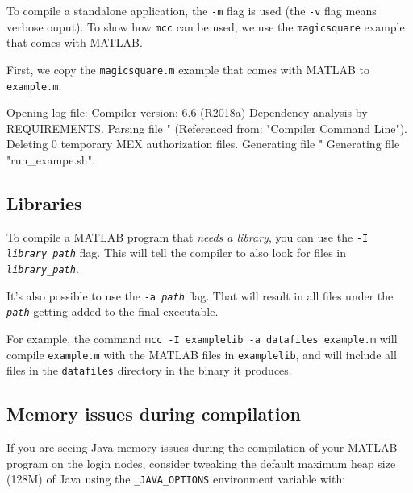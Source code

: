 To compile a standalone application, the \lstinline|-m|
flag is used (the \lstinline|-v| flag means verbose ouput).
To show how \lstinline|mcc| can be used, we use the \lstinline|magicsquare| example
that comes with MATLAB.

First, we copy the \lstinline|magicsquare.m| example that comes with MATLAB to \lstinline|example.m|.


\begin{prompt}
Opening log file:  %
Compiler version: 6.6 (R2018a)
Dependency analysis by REQUIREMENTS.
Parsing file "%
	(Referenced from: "Compiler Command Line").
Deleting 0 temporary MEX authorization files.
Generating file "%
Generating file "run\_exampe.sh".
\end{prompt}

\subsection{Libraries}

To compile a MATLAB program that \emph{needs a library}, you can use the
\texttt{-I \emph{library\_path}} flag. This will tell the compiler to also
look for files in \texttt{\emph{library\_path}}.

It's also possible to use the \texttt{-a \emph{path}} flag. That will result in
all files under the \texttt{\emph{path}} getting added to the final executable.

For example, the command \lstinline|mcc -I examplelib -a datafiles example.m| will
compile \lstinline|example.m| with the MATLAB files in \lstinline|examplelib|, and will
include all files in the \lstinline|datafiles| directory in the binary it produces.

\subsection{Memory issues during compilation}

If you are seeing Java memory issues during the compilation of your MATLAB program
on the login nodes, consider tweaking the default maximum heap size (128M) of Java
using the \lstinline|_JAVA_OPTIONS| environment variable with:

\begin{prompt}
\end{prompt}

